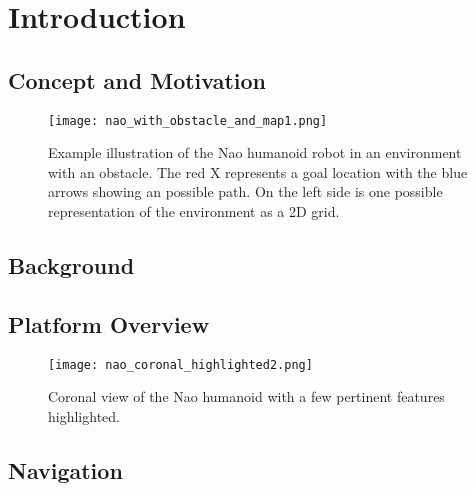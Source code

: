 \chapter{Introduction} \label{ch:introduction}

\section{Concept and Motivation}

\begin{figure}[h!]
	\centering
	\texttt{[image: nao\_with\_obstacle\_and\_map1.png]}
	\caption
	{Example illustration of the Nao humanoid robot in an environment with an obstacle. The red X represents a goal
		location with the blue arrows showing an possible path. On the left side is one possible representation
		of the environment as a 2D grid.}
	\label{fig:nao_with_map1}
\end{figure}

\section{Background}

\section{Platform Overview}

\begin{figure}
	\centering
	\texttt{[image: nao\_coronal\_highlighted2.png]}
	\caption
	{Coronal view of the Nao humanoid with a few pertinent features highlighted. }
	\label{fig:nao_diagram1}
\end{figure}


\section{Navigation}

